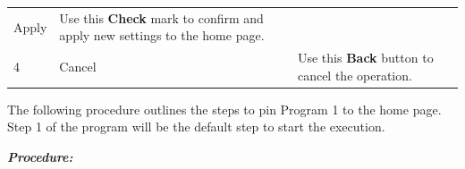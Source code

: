 \begin{longtable}[]{@{}lll@{}}
\begin{minipage}[t]{0.23\columnwidth}
Apply\strut
\end{minipage} & \begin{minipage}[t]{0.65\columnwidth}\raggedright
Use this \textbf{Check} mark to confirm and apply new settings to the
home page.\strut
\end{minipage}\tabularnewline
\begin{minipage}[t]{0.04\columnwidth}\raggedright
4\strut
\end{minipage} & \begin{minipage}[t]{0.23\columnwidth}\raggedright
Cancel\strut
\end{minipage} & \begin{minipage}[t]{0.65\columnwidth}\raggedright
Use this \textbf{Back} button to cancel the operation.\strut
\end{minipage}\tabularnewline
\bottomrule
\end{longtable}

The following procedure outlines the steps to pin Program 1 to the home
page. Step 1 of the program will be the default step to start the
execution.

\textbf{\emph{Procedure:}}


